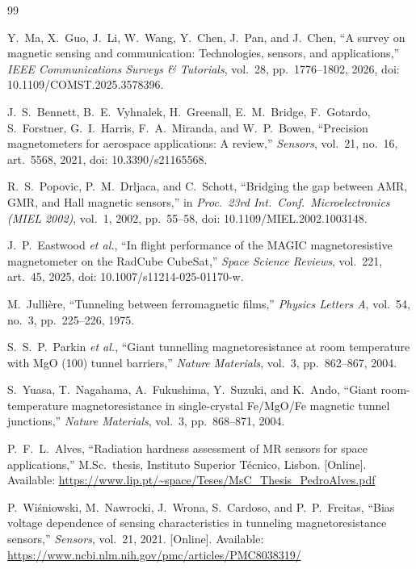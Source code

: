 \documentclass[12pt,a4paper]{article}
\begin{document}
\begin{thebibliography}{99}
\sloppy

Y.\ Ma, X.\ Guo, J.\ Li, W.\ Wang, Y.\ Chen, J.\ Pan, and J.\ Chen, ``A survey on magnetic sensing and communication: Technologies, sensors, and applications,'' \emph{IEEE Communications Surveys \& Tutorials}, vol.~28, pp.~1776--1802, 2026, doi: 10.1109/COMST.2025.3578396.

J.\ S.\ Bennett, B.\ E.\ Vyhnalek, H.\ Greenall, E.\ M.\ Bridge, F.\ Gotardo, S.\ Forstner, G.\ I.\ Harris, F.\ A.\ Miranda, and W.\ P.\ Bowen, ``Precision magnetometers for aerospace applications: A review,'' \emph{Sensors}, vol.~21, no.~16, art.~5568, 2021, doi: 10.3390/s21165568.

R.\ S.\ Popovic, P.\ M.\ Drljaca, and C.\ Schott, ``Bridging the gap between AMR, GMR, and Hall magnetic sensors,'' in \emph{Proc.\ 23rd Int.\ Conf.\ Microelectronics (MIEL 2002)}, vol.~1, 2002, pp.~55--58, doi: 10.1109/MIEL.2002.1003148.

J.\ P.\ Eastwood \emph{et al.}, ``In flight performance of the MAGIC magnetoresistive magnetometer on the RadCube CubeSat,'' \emph{Space Science Reviews}, vol.~221, art.~45, 2025, doi: 10.1007/s11214-025-01170-w.

M.\ Julli\`ere, ``Tunneling between ferromagnetic films,'' \emph{Physics Letters A}, vol.~54, no.~3, pp.~225--226, 1975.

S.\ S.\ P.\ Parkin \emph{et al.}, ``Giant tunnelling magnetoresistance at room temperature with MgO (100) tunnel barriers,'' \emph{Nature Materials}, vol.~3, pp.~862--867, 2004.

S.\ Yuasa, T.\ Nagahama, A.\ Fukushima, Y.\ Suzuki, and K.\ Ando, ``Giant room-temperature magnetoresistance in single-crystal Fe/MgO/Fe magnetic tunnel junctions,'' \emph{Nature Materials}, vol.~3, pp.~868--871, 2004.

P.\ F.\ L.\ Alves, ``Radiation hardness assessment of MR sensors for space applications,'' M.Sc.\ thesis, Instituto Superior T\'ecnico, Lisbon. [Online]. Available: \url{https://www.lip.pt/~space/Teses/MsC_Thesis_PedroAlves.pdf}

P.\ Wi\'sniowski, M.\ Nawrocki, J.\ Wrona, S.\ Cardoso, and P.\ P.\ Freitas, ``Bias voltage dependence of sensing characteristics in tunneling magnetoresistance sensors,'' \emph{Sensors}, vol.~21, 2021. [Online]. Available: \url{https://www.ncbi.nlm.nih.gov/pmc/articles/PMC8038319/}


\end{thebibliography}
\end{document}
